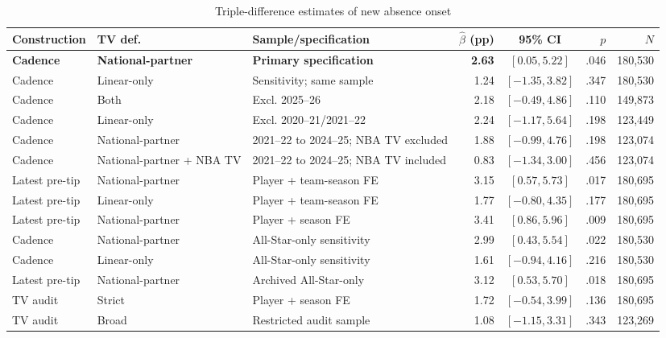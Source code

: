 \documentclass[11pt]{article}
\begin{document}
\begin{table}[!htbp]\centering\caption{Triple-difference estimates of new absence onset}\label{tab:tvfull}\footnotesize\setlength{\tabcolsep}{3pt}
\begin{tabular}{@{}llp{3.7cm}rcrr@{}}\toprule
Construction & TV def. & Sample/specification & $\hat\beta$ (pp) & 95\% CI & $p$ & $N$\\\midrule
\textbf{Cadence} & \textbf{National-partner} & \textbf{Primary specification} & \textbf{2.63} & $[0.05,5.22]$ & .046 & 180,530\\
Cadence & Linear-only & Sensitivity; same sample & 1.24 & $[-1.35,3.82]$ & .347 & 180,530\\
Cadence & Both & Excl. 2025--26 & 2.18 & $[-0.49,4.86]$ & .110 & 149,873\\
Cadence & Linear-only & Excl. 2020--21/2021--22 & 2.24 & $[-1.17,5.64]$ & .198 & 123,449\\
Cadence & National-partner & 2021--22 to 2024--25; NBA TV excluded & 1.88 & $[-0.99,4.76]$ & .198 & 123,074\\
Cadence & National-partner + NBA TV & 2021--22 to 2024--25; NBA TV included & 0.83 & $[-1.34,3.00]$ & .456 & 123,074\\
Latest pre-tip & National-partner & Player + team-season FE & 3.15 & $[0.57,5.73]$ & .017 & 180,695\\
Latest pre-tip & Linear-only & Player + team-season FE & 1.77 & $[-0.80,4.35]$ & .177 & 180,695\\
Latest pre-tip & National-partner & Player + season FE & 3.41 & $[0.86,5.96]$ & .009 & 180,695\\
Cadence & National-partner & All-Star-only sensitivity & 2.99 & $[0.43,5.54]$ & .022 & 180,530\\
Cadence & Linear-only & All-Star-only sensitivity & 1.61 & $[-0.94,4.16]$ & .216 & 180,530\\
Latest pre-tip & National-partner & Archived All-Star-only & 3.12 & $[0.53,5.70]$ & .018 & 180,695\\
TV audit & Strict & Player + season FE & 1.72 & $[-0.54,3.99]$ & .136 & 180,695\\
TV audit & Broad & Restricted audit sample & 1.08 & $[-1.15,3.31]$ & .343 & 123,269\\\bottomrule

\end{tabular}
\end{table}
\end{document}
